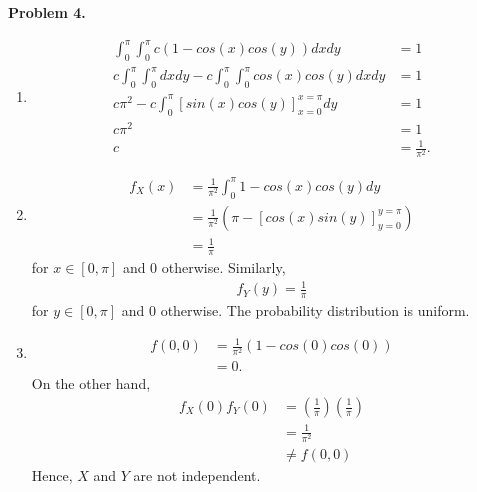 \documentclass{article}
\begin{document}
\textbf{Problem 4.}
\begin{enumerate}[label={(\alph*)}]
    \item 
    \begin{align}
        \int_{0}^{\pi}\int_{0}^{\pi}c(1-cos(x)cos(y))dxdy & = 1 \\
        c\int_{0}^{\pi}\int_{0}^{\pi}dxdy - c\int_{0}^{\pi}\int_{0}^{\pi}cos(x)cos(y)dxdy & = 1 \\
        c\pi^2 - c\int_{0}^{\pi}\left[sin(x)cos(y)\right]_{x=0}^{x=\pi}dy & = 1\\
        c\pi^2 & = 1 \\
        c & = \frac{1}{\pi^2}.
    \end{align}

    \item 
    \begin{align}
        f_X(x) & = \frac{1}{\pi^2}\int_{0}^{\pi}1-cos(x)cos(y)dy \\
        & = \frac{1}{\pi^2}\left(\pi - \left[cos(x)sin(y)\right]_{y=0}^{y=\pi}\right) \\
        & = \frac{1}{\pi} 
    \end{align}
    for $x\in [0,\pi]$ and 0 otherwise. Similarly,
    \begin{align}
        f_Y(y) = \frac{1}{\pi}
    \end{align}
    for $y\in [0,\pi]$ and 0 otherwise. The probability distribution is uniform.

    \item 
    \begin{align}
        f(0,0) & = \frac{1}{\pi^2}\left(1-cos(0)cos(0)\right) \\
        & = 0.
    \end{align}
    On the other hand,
    \begin{align}
        f_X(0)f_Y(0) & = \left(\frac{1}{\pi}\right)\left(\frac{1}{\pi}\right) \\
        & = \frac{1}{\pi^2} \\
        & \neq f(0,0)
    \end{align}
    Hence, $X$ and $Y$ are not independent.
\end{enumerate}
\bigbreak
\end{document}

